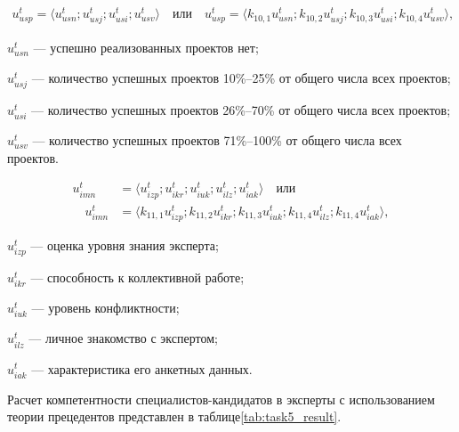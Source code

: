 \begin{align*}
	u^t_{usp} = \langle u^t_{usn} ; u^t_{usj} ; u^t_{usi} ; u^t_{usv} \rangle \quad \text{или} \quad u^t_{usp} = \langle k_{10,1} u^t_{usn} ; k_{10,2} u^t_{usj} ; k_{10,3} u^t_{usi} ; k_{10,4} u^t_{usv} \rangle,
\end{align*}
\begin{description}
	\item[где] $u^t_{usn}$ --- успешно реализованных проектов нет;
	\item $u^t_{usj}$ --- количество успешных проектов 10\%–25\% от общего числа всех проектов;
	\item $u^t_{usi}$ --- количество успешных проектов 26\%–70\% от общего числа всех проектов;
	\item $u^t_{usv}$ --- количество успешных проектов 71\%–100\% от общего числа всех проектов.
\end{description}
\begin{align*}
	u^t_{imn} & = \langle u^t_{izp} ; u^t_{ikr} ; u^t_{iuk} ; u^t_{ilz} ; u^t_{iak} \rangle \quad \text{или} \\ \quad u^t_{imn} &= \langle k_{11,1} u^t_{izp} ; k_{11,2} u^t_{ikr} ; k_{11,3} u^t_{iuk} ; k_{11,4} u^t_{ilz} ; k_{11,4} u^t_{iak} \rangle,
\end{align*}
\begin{description}
	\item[где] $u^t_{izp}$ --- оценка уровня знания эксперта;
	\item $u^t_{ikr}$ --- способность к коллективной работе;
	\item $u^t_{iuk}$ --- уровень конфликтности;
	\item $u^t_{ilz}$ --- личное знакомство с экспертом;
	\item $u^t_{iak}$ --- характеристика его анкетных данных.
\end{description}

Расчет компетентности специалистов-кандидатов в эксперты с использованием теории прецедентов представлен в таблице\ref{tab:task5_result}.

